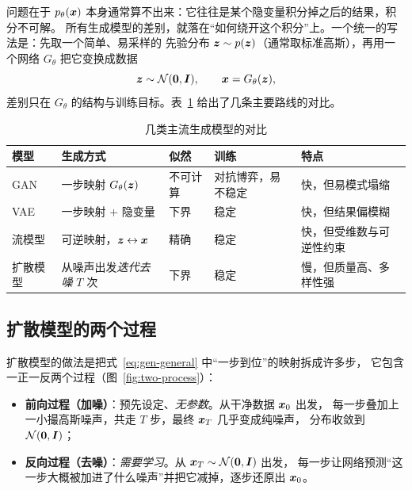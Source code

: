 问题在于 $p_\theta(\bm{x})$ 本身通常算不出来：它往往是某个隐变量积分掉之后的结果，积分不可解。
所有生成模型的差别，就落在“如何绕开这个积分”上。一个统一的写法是：先取一个简单、易采样的
先验分布 $\bm{z}\sim p(\bm{z})$（通常取标准高斯），再用一个网络 $G_\theta$ 把它变换成数据
\begin{equation}
  \bm{z} \sim \mathcal{N}(\bm{0},\bm{I}), \qquad \bm{x} = G_\theta(\bm{z}),
  \label{eq:gen-general}
\end{equation}
差别只在 $G_\theta$ 的结构与训练目标。表~\ref{tab:gen-compare} 给出了几条主要路线的对比。

\begin{table}[htbp]
  \centering
  \caption{几类主流生成模型的对比}
  \label{tab:gen-compare}
  \small
  \renewcommand{\arraystretch}{1.35}
  \setlength{\tabcolsep}{5pt}
  \begin{tabular}{@{}l p{3.0cm} l l p{3.1cm}@{}}
    \toprule
    模型 & 生成方式 & 似然 & 训练 & 特点 \\
    \midrule
    GAN        & 一步映射 $G_\theta(\bm{z})$            & 不可计算 & 对抗博弈，易不稳定 & 快，但易模式塌缩 \\
    VAE        & 一步映射 $+$ 隐变量                 & 下界     & 稳定               & 快，但结果偏模糊 \\
    流模型     & 可逆映射，$\bm{z}\leftrightarrow\bm{x}$   & 精确     & 稳定               & 快，但受维数与可逆性约束 \\
    扩散模型   & 从噪声出发\emph{迭代去噪} $T$ 次     & 下界     & 稳定               & 慢，但质量高、多样性强 \\
    \bottomrule
  \end{tabular}
\end{table}

\subsection{扩散模型的两个过程}

扩散模型的做法是把式~\eqref{eq:gen-general} 中“一步到位”的映射拆成许多步\cite{sohl2015deep,ho2020ddpm}，
它包含一正一反两个过程（图~\ref{fig:two-process}）：

\begin{itemize}
  \item \textbf{前向过程（加噪）}：预先设定、\emph{无参数}。从干净数据 $\bm{x}_0$ 出发，
        每一步叠加上一小撮高斯噪声，共走 $T$ 步，最终 $\bm{x}_T$ 几乎变成纯噪声，
        分布收敛到 $\mathcal{N}(\bm{0},\bm{I})$；
  \item \textbf{反向过程（去噪）}：\emph{需要学习}。从 $\bm{x}_T\sim\mathcal{N}(\bm{0},\bm{I})$ 出发，
        每一步让网络预测“这一步大概被加进了什么噪声”并把它减掉，逐步还原出 $\bm{x}_0$。
\end{itemize}

